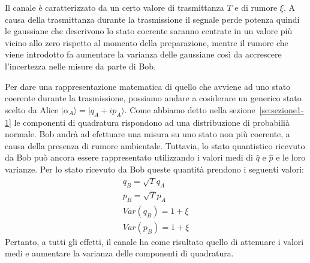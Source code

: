 Il canale \`e caratterizzato da un certo valore di trasmittanza $T$ e di rumore $\xi$. A causa della trasmittanza durante la trasmissione il segnale perde potenza quindi le gaussiane che descrivono lo stato coerente saranno centrate in un valore pi\`u vicino allo zero rispetto al momento della preparazione, mentre il rumore che viene introdotto fa aumentare la varianza delle gaussiane cos\`i da accrescere l'incertezza nelle misure da parte di Bob.

Per dare una rappresentazione matematica di quello che avviene ad uno stato coerente durante la trasmissione, possiamo andare a cosiderare un generico stato scelto da Alice $|\alpha_A \rangle = | q_A + i p_A\rangle$. Come abbiamo detto nella sezione~\ref{se:sezione1-1} le componenti di quadratura rispondono ad una distribuzione di probabili\`a normale. %
Bob andrà ad efettuare una misura su uno stato non più coerente, a causa della presenza di rumore ambientale. Tuttavia, lo stato quantistico ricevuto da Bob può ancora essere rappresentato utilizzando i valori medi di $\hat q$ e $\hat p$ e le loro varianze. Per lo stato ricevuto da Bob queste quantità prendono i seguenti valori:
\begin{equation}\label{eq:stato-bob}
\begin{split}
q_B = \sqrt{T} q_A \\
p_B = \sqrt{T} p_A \\
Var(q_B) = 1 + \xi \\
Var(p_B) = 1 + \xi
\end{split}
\end{equation}
Pertanto, a tutti gli effetti, il canale ha come risultato quello di attenuare i valori medi e aumentare la varianza delle componenti di quadratura. 

